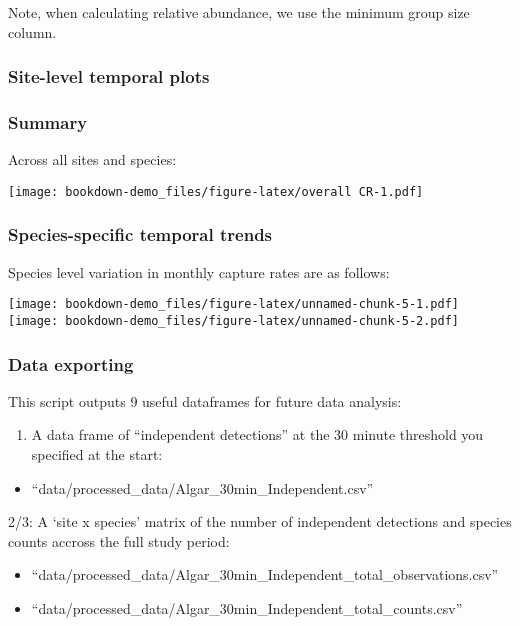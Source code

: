 \documentclass[]{book}
\providecommand{\tightlist}{%
  \setlength{\itemsep}{0pt}\setlength{\parskip}{0pt}}
\begin{document}
Note, when calculating relative abundance, we use the minimum group size
column.

\subsubsection{Site-level temporal
plots}\label{site-level-temporal-plots}

\subsubsection{Summary}\label{summary}

Across all sites and species:

\texttt{[image: bookdown-demo\_files/figure-latex/overall CR-1.pdf]}

\subsubsection{Species-specific temporal
trends}\label{species-specific-temporal-trends}

Species level variation in monthly capture rates are as follows:

\texttt{[image: bookdown-demo\_files/figure-latex/unnamed-chunk-5-1.pdf]}
\texttt{[image: bookdown-demo\_files/figure-latex/unnamed-chunk-5-2.pdf]}

\subsubsection{Data exporting}\label{data-exporting}

This script outputs 9 useful dataframes for future data analysis:

\begin{enumerate}
\def\labelenumi{\arabic{enumi}.}
\tightlist
\item
  A data frame of ``independent detections'' at the 30 minute threshold
  you specified at the start:
\end{enumerate}

\begin{itemize}
\tightlist
\item
  ``data/processed\_data/Algar\_30min\_Independent.csv''
\end{itemize}

2/3: A `site x species' matrix of the number of independent detections
and species counts accross the full study period:

\begin{itemize}
\item
  ``data/processed\_data/Algar\_30min\_Independent\_total\_observations.csv''
\item
  ``data/processed\_data/Algar\_30min\_Independent\_total\_counts.csv''
\end{itemize}
\end{document}
